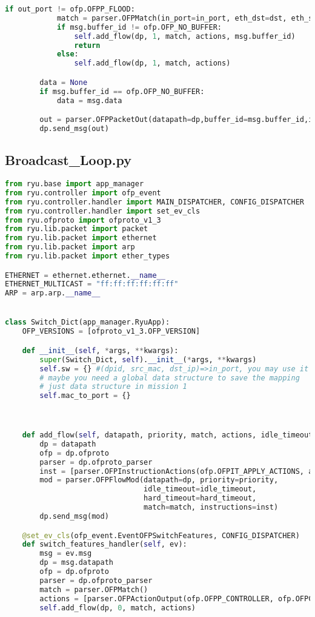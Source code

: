 \documentclass{xjtureport}
\begin{document}
\begin{lstlisting}[language=Python]
		if out_port != ofp.OFPP_FLOOD:
			match = parser.OFPMatch(in_port=in_port, eth_dst=dst, eth_src=src)
			if msg.buffer_id != ofp.OFP_NO_BUFFER:
				self.add_flow(dp, 1, match, actions, msg.buffer_id)
				return
			else:
				self.add_flow(dp, 1, match, actions)

		data = None
		if msg.buffer_id == ofp.OFP_NO_BUFFER:
			data = msg.data

		out = parser.OFPPacketOut(datapath=dp,buffer_id=msg.buffer_id,in_port=in_port, actions=actions, data=data)
		dp.send_msg(out)
\end{lstlisting}
\subsection{Broadcast\_Loop.py}
\begin{lstlisting}[language=Python]
from ryu.base import app_manager
from ryu.controller import ofp_event
from ryu.controller.handler import MAIN_DISPATCHER, CONFIG_DISPATCHER
from ryu.controller.handler import set_ev_cls
from ryu.ofproto import ofproto_v1_3
from ryu.lib.packet import packet
from ryu.lib.packet import ethernet
from ryu.lib.packet import arp
from ryu.lib.packet import ether_types

ETHERNET = ethernet.ethernet.__name__
ETHERNET_MULTICAST = "ff:ff:ff:ff:ff:ff"
ARP = arp.arp.__name__


class Switch_Dict(app_manager.RyuApp):
	OFP_VERSIONS = [ofproto_v1_3.OFP_VERSION]

	def __init__(self, *args, **kwargs):
		super(Switch_Dict, self).__init__(*args, **kwargs)
		self.sw = {} #(dpid, src_mac, dst_ip)=>in_port, you may use it in mission 2
		# maybe you need a global data structure to save the mapping
		# just data structure in mission 1
		self.mac_to_port = {}



	def add_flow(self, datapath, priority, match, actions, idle_timeout=0, hard_timeout=0):
		dp = datapath
		ofp = dp.ofproto
		parser = dp.ofproto_parser
		inst = [parser.OFPInstructionActions(ofp.OFPIT_APPLY_ACTIONS, actions)]
		mod = parser.OFPFlowMod(datapath=dp, priority=priority,
								idle_timeout=idle_timeout,
								hard_timeout=hard_timeout,
								match=match, instructions=inst)
		dp.send_msg(mod)

	@set_ev_cls(ofp_event.EventOFPSwitchFeatures, CONFIG_DISPATCHER)
	def switch_features_handler(self, ev):
		msg = ev.msg
		dp = msg.datapath
		ofp = dp.ofproto
		parser = dp.ofproto_parser
		match = parser.OFPMatch()
		actions = [parser.OFPActionOutput(ofp.OFPP_CONTROLLER, ofp.OFPCML_NO_BUFFER)]
		self.add_flow(dp, 0, match, actions)


\end{lstlisting}
\end{document}
